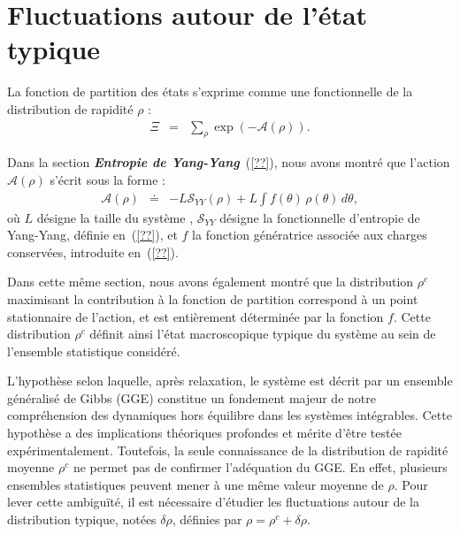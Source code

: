 \minitoc

\section{Fluctuations autour de l’état typique}

La fonction de partition des états s’exprime comme une fonctionnelle de la distribution de rapidité \( \rho \) :
\begin{eqnarray}
	\Xi & = & \sum_\rho \exp\left( -\mathcal{A}(\rho) \right).
\end{eqnarray}

Dans la section \textit{\textbf{Entropie de Yang-Yang}}~(\ref{??}), nous avons montré que l’action \( \mathcal{A}(\rho) \) s’écrit sous la forme :
\begin{eqnarray}
	\mathcal{A}(\rho) & \doteq & - L \mathcal{S}_{YY}(\rho) + L \int f(\theta)\, \rho(\theta) \, d\theta, \label{eq:action}
\end{eqnarray}
où \( L \) désigne la taille du système ,  \( \mathcal{S}_{YY} \) désigne la fonctionnelle d'entropie de Yang-Yang, définie en~(\ref{??}), et \( f \) la fonction génératrice associée aux charges conservées, introduite en~(\ref{??}).

Dans cette même section, nous avons également montré que la distribution \( \rho^c \) maximisant la contribution à la fonction de partition correspond à un point stationnaire de l'action, et est entièrement déterminée par la fonction \( f \). Cette distribution \( \rho^c \) définit ainsi l’état macroscopique typique du système au sein de l’ensemble statistique considéré.

L’hypothèse selon laquelle, après relaxation, le système est décrit par un ensemble généralisé de Gibbs (GGE) constitue un fondement majeur de notre compréhension des dynamiques hors équilibre dans les systèmes intégrables. Cette hypothèse a des implications théoriques profondes et mérite d’être testée expérimentalement. Toutefois, la seule connaissance de la distribution de rapidité moyenne \( \rho^c \) ne permet pas de confirmer l'adéquation du GGE. En effet, plusieurs ensembles statistiques peuvent mener à une même valeur moyenne de \( \rho \). Pour lever cette ambiguïté, il est nécessaire d’étudier les fluctuations autour de la distribution typique, notées \( \delta \rho \), définies par \( \rho = \rho^c + \delta \rho \).

